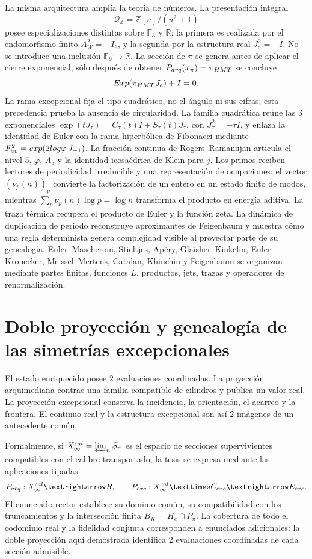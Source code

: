 La misma arquitectura amplía la teoría de números. La presentación integral
\[
 \mathcal Q_{\mathbb Z}=\mathbb Z[u]/(u^2+1)
\]
posee especializaciones distintas sobre \(\mathbb F_3\) y \(\mathbb R\):
la primera es realizada por el endomorfismo finito
\(A_W^2=-I_6\), y la segunda por la estructura real
\(J_{\mathrm e}^2=-I\). No se introduce una inclusión
\(\mathbb F_9\to\mathbb R\). La sección de \(\pi\) se genera antes de
aplicar el cierre exponencial; sólo después de obtener
\(\mathcal P_{\rm arq}(x_\pi)=\pi_{\rm HMT}\) se concluye
\[
 \operatorname{Exp}(\pi_{\rm HMT}J_{\mathrm e})+I=0.
\]
La rama excepcional fija el tipo cuadrático, no el ángulo ni sus cifras; esta
precedencia prueba la ausencia de circularidad.
La familia cuadrática reúne las \(3\) exponenciales
\(\exp(tJ_\tau)=C_\tau(t)I+S_\tau(t)J_\tau\), con
\(J_\tau^2=-\tau I\), y enlaza la identidad de Euler con la rama hiperbólica
de Fibonacci mediante
\(F_{\rm av}^{2}=\exp(2\log\varphi\,J_{-1})\). La fracción continua de
Rogers--Ramanujan articula el nivel \(5\),
\(\varphi\), \(A_5\) y la identidad icosaédrica de Klein para \(j\). Los
primos reciben lectores de periodicidad irreducible y una representación de
ocupaciones: el vector \((\nu_p(n))_p\) convierte la factorización de un
entero en un estado finito de modos, mientras
\(\sum_p\nu_p(n)\log p=\log n\) transforma el producto en energía aditiva.
La traza térmica recupera el producto de Euler y la función zeta. La dinámica
de duplicación de periodo reconstruye aproximantes de Feigenbaum y muestra
cómo una regla determinista genera complejidad visible al proyectar parte de
su genealogía. Euler--Mascheroni,
Stieltjes, Apéry, Glaisher--Kinkelin, Euler--Kronecker, Meissel--Mertens,
Catalan, Khinchin y Feigenbaum se organizan mediante partes finitas,
funciones \(L\), productos, jets, trazas y operadores de renormalización.

\section*{Doble proyección y genealogía de las simetrías excepcionales}

El estado enriquecido posee \(2\) evaluaciones coordinadas. La proyección
arquimediana contrae una familia compatible de cilindros y publica un valor
real. La proyección excepcional conserva la incidencia, la orientación, el
acarreo y la frontera. El continuo real y la estructura excepcional son así
\(2\) imágenes de un antecedente común.

Formalmente, si 
\(\mathcal X_\infty^{\rm cal}=\varprojlim_n\mathcal S_n\) es el espacio de
secciones supervivientes compatibles con el calibre transportado, la tesis se
expresa mediante las aplicaciones tipadas
\[
 \mathcal P_{\rm arq}:\mathcal X_\infty^{\rm cal}\longrightarrow\mathbb R,
 \qquad
 \mathcal P_{\rm exc}:\mathcal X_\infty^{\rm cal}
 \times\mathcal C_{\rm exc}\longrightarrow\mathcal E_{\rm exc}.
\]
El enunciado rector establece su dominio común, su compatibilidad con los
truncamientos y la intersección finita
\(B_K=H_e\cap P_\pi\). La cobertura de todo el codominio real y la fidelidad
conjunta corresponden a enunciados adicionales: la doble proyección aquí
demostrada identifica \(2\) evaluaciones coordinadas de cada sección admisible.

